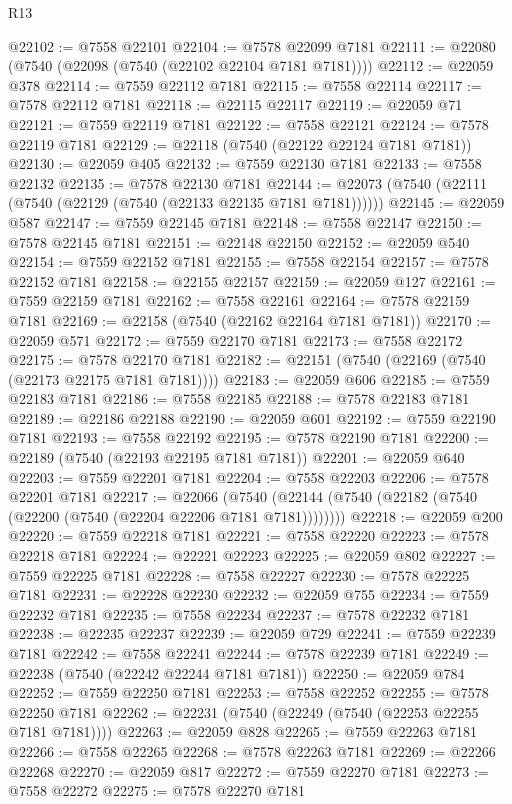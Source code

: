 \begin{lexlean}{R13}
\begin{coremodule}
@22102 := @7558 @22101
@22104 := @7578 @22099 @7181
@22111 := @22080 (@7540 (@22098 (@7540 (@22102 @22104 @7181 @7181))))
@22112 := @22059 @378
@22114 := @7559 @22112 @7181
@22115 := @7558 @22114
@22117 := @7578 @22112 @7181
@22118 := @22115 @22117
@22119 := @22059 @71
@22121 := @7559 @22119 @7181
@22122 := @7558 @22121
@22124 := @7578 @22119 @7181
@22129 := @22118 (@7540 (@22122 @22124 @7181 @7181))
@22130 := @22059 @405
@22132 := @7559 @22130 @7181
@22133 := @7558 @22132
@22135 := @7578 @22130 @7181
@22144 := @22073 (@7540 (@22111 (@7540 (@22129 (@7540 (@22133 @22135 @7181 @7181))))))
@22145 := @22059 @587
@22147 := @7559 @22145 @7181
@22148 := @7558 @22147
@22150 := @7578 @22145 @7181
@22151 := @22148 @22150
@22152 := @22059 @540
@22154 := @7559 @22152 @7181
@22155 := @7558 @22154
@22157 := @7578 @22152 @7181
@22158 := @22155 @22157
@22159 := @22059 @127
@22161 := @7559 @22159 @7181
@22162 := @7558 @22161
@22164 := @7578 @22159 @7181
@22169 := @22158 (@7540 (@22162 @22164 @7181 @7181))
@22170 := @22059 @571
@22172 := @7559 @22170 @7181
@22173 := @7558 @22172
@22175 := @7578 @22170 @7181
@22182 := @22151 (@7540 (@22169 (@7540 (@22173 @22175 @7181 @7181))))
@22183 := @22059 @606
@22185 := @7559 @22183 @7181
@22186 := @7558 @22185
@22188 := @7578 @22183 @7181
@22189 := @22186 @22188
@22190 := @22059 @601
@22192 := @7559 @22190 @7181
@22193 := @7558 @22192
@22195 := @7578 @22190 @7181
@22200 := @22189 (@7540 (@22193 @22195 @7181 @7181))
@22201 := @22059 @640
@22203 := @7559 @22201 @7181
@22204 := @7558 @22203
@22206 := @7578 @22201 @7181
@22217 := @22066
    (@7540 (@22144 (@7540 (@22182 (@7540 (@22200 (@7540 (@22204 @22206 @7181 @7181))))))))
@22218 := @22059 @200
@22220 := @7559 @22218 @7181
@22221 := @7558 @22220
@22223 := @7578 @22218 @7181
@22224 := @22221 @22223
@22225 := @22059 @802
@22227 := @7559 @22225 @7181
@22228 := @7558 @22227
@22230 := @7578 @22225 @7181
@22231 := @22228 @22230
@22232 := @22059 @755
@22234 := @7559 @22232 @7181
@22235 := @7558 @22234
@22237 := @7578 @22232 @7181
@22238 := @22235 @22237
@22239 := @22059 @729
@22241 := @7559 @22239 @7181
@22242 := @7558 @22241
@22244 := @7578 @22239 @7181
@22249 := @22238 (@7540 (@22242 @22244 @7181 @7181))
@22250 := @22059 @784
@22252 := @7559 @22250 @7181
@22253 := @7558 @22252
@22255 := @7578 @22250 @7181
@22262 := @22231 (@7540 (@22249 (@7540 (@22253 @22255 @7181 @7181))))
@22263 := @22059 @828
@22265 := @7559 @22263 @7181
@22266 := @7558 @22265
@22268 := @7578 @22263 @7181
@22269 := @22266 @22268
@22270 := @22059 @817
@22272 := @7559 @22270 @7181
@22273 := @7558 @22272
@22275 := @7578 @22270 @7181

\end{coremodule}
\end{lexlean}
